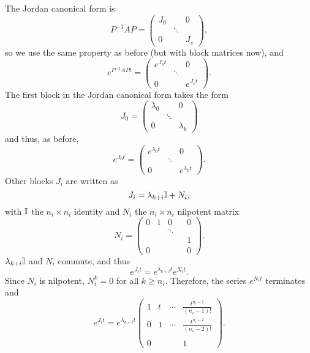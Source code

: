 The Jordan canonical form is
\[
P^{-1}AP=
\begin{pmatrix}
J_0 & & 0\\
& \ddots & \\
0 & & J_s
\end{pmatrix},
\]
so we use the same property as before (but with block matrices now), and
\[
e^{P^{-1}APt}=
\begin{pmatrix}
e^{J_0t} & & 0\\
& \ddots & \\
0 & & e^{J_st}
\end{pmatrix}.
\]
The first block in the Jordan canonical form takes the form
\[
J_0=
\begin{pmatrix}
\lambda_0 & & 0\\
& \ddots & \\
0 & & \lambda_k
\end{pmatrix}
\]
and thus, as before,
\[
e^{J_0t}=
\begin{pmatrix}
e^{\lambda_0t} & & 0\\
& \ddots & \\
0 & & e^{\lambda_kt}
\end{pmatrix}.
\]
Other blocks $J_i$ are written as
\[
J_i=\lambda_{k+i}\mathbb{I}+N_i,
\]
with $\mathbb{I}$ the $n_i\times n_i$ identity and $N_i$ the $n_i\times n_i$ nilpotent matrix
\[
N_i=\begin{pmatrix}
0 & 1 & 0 && 0 \\
&&\ddots && \\
&&&& 1 \\
0& &&&0
\end{pmatrix}.
\]
$\lambda_{k+i}\mathbb{I}$ and $N_i$ commute, and thus
\[
e^{J_it}=e^{\lambda_{k+i}t}e^{N_it}.
\]
Since $N_i$ is nilpotent, $N_i^k=0$ for all $k\geq n_i$. Therefore, the series $e^{N_it}$ terminates and
\[
e^{J_it}=e^{\lambda_{k+i}t}
\begin{pmatrix}
1 & t & \cdots & \frac{t^{n_i-1}}{(n_i-1)!} \\
0 & 1 & \cdots & \frac{t^{n_i-2}}{(n_i-2)!} \\
&&& \\
0 &&& 1
\end{pmatrix}.
\]


